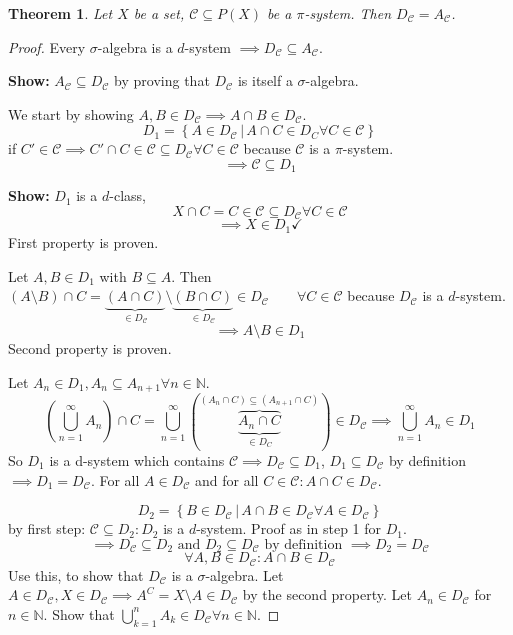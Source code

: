 \documentclass{article}
\newtheorem{theorem}{Theorem}  \numberwithin{theorem}{section}
\newcommand{\setdef}[2]{\left\{\left.#1\,\right|\,#2\right\}}
\begin{document}
\begin{theorem} %
  Let $X$ be a set, $\mathcal C \subseteq P(X)$ be a $\pi$-system. Then $D_{\mathcal C} = A_{\mathcal C}$.
\end{theorem}
\begin{proof}
  Every $\sigma$-algebra is a $d$-system $\implies D_{\mathcal C} \subseteq A_{\mathcal C}$.

  \textbf{Show:} $A_{\mathcal C} \subseteq D_{\mathcal C}$ by proving that $D_{\mathcal C}$ is itself a $\sigma$-algebra.

  We start by showing $A,B \in D_{\mathcal C} \implies A \cap B \in D_{\mathcal C}$.
  \[ D_1 = \setdef{A \in D_{\mathcal C}}{A \cap C \in D_C \forall C \in \mathcal C} \]
  if $C' \in \mathcal C \implies C' \cap C \in \mathcal C \subseteq D_{\mathcal C} \forall C \in \mathcal C$ because $\mathcal C$ is a $\pi$-system.
  \[ \implies \mathcal C \subseteq D_1 \]

  \textbf{Show:} $D_1$ is a $d$-class,
  \[ X \cap C = C \in \mathcal C \subseteq D_{\mathcal C} \forall C \in \mathcal C \]
  \[ \implies X \in D_1 \checkmark \]
  First property is proven.

  Let $A,B \in D_1$ with $B \subseteq A$. Then $(A \setminus B) \cap C = \underbrace{(A \cap C)}_{\in D_{\mathcal C}} \setminus \underbrace{(B \cap C)}_{\in D_{\mathcal C}} \in D_{\mathcal C} \qquad \forall C \in \mathcal C$
  because $D_{\mathcal C}$ is a $d$-system.
  \[ \implies A \setminus B \in D_1 \]
  Second property is proven.

  Let $A_n \in D_1, A_n \subseteq A_{n+1} \forall n \in \mathbb N$.
  \[ (\bigcup_{n=1}^\infty A_n) \cap C = \bigcup_{n=1}^\infty \left(\overbrace{\underbrace{A_n \cap C}_{\in D_C}}^{(A_n \cap C) \subseteq (A_{n+1} \cap C)}\right) \in D_{\mathcal C} \implies \bigcup_{n=1}^\infty A_n \in D_1 \]
  So $D_1$ is a d-system which contains $\mathcal C \implies D_{\mathcal C} \subseteq D_1$, $D_1 \subseteq D_{\mathcal C}$ by definition $\implies D_1 = D_{\mathcal C}$.
  For all $A \in D_{\mathcal C}$ and for all $C \in \mathcal C: A \cap C \in D_{\mathcal C}$.

  \[ D_2 = \setdef{B \in D_{\mathcal C}}{A \cap B \in D_{\mathcal C} \forall A \in D_{\mathcal C}} \]
  by first step: $\mathcal C \subseteq D_2: D_2$ is a $d$-system. Proof as in step 1 for $D_1$.
  \[ \implies D_{\mathcal C} \subseteq D_2 \text{ and } D_2 \subseteq D_{\mathcal C} \text{ by definition } \implies D_2 = D_{\mathcal C} \]
  \[ \forall A, B \in D_{\mathcal C}: A \cap B \in D_{\mathcal C} \]
  Use this, to show that $D_{\mathcal C}$ is a $\sigma$-algebra.
  Let $A \in D_{\mathcal C}, X \in D_{\mathcal C} \implies A^C = X \setminus A \in D_{\mathcal C}$ by the second property.
  Let $A_n \in D_{\mathcal C}$ for $n \in \mathbb N$. Show that $\bigcup_{k=1}^n A_k \in D_{\mathcal C} \forall n \in \mathbb N$.


\end{proof}
\end{document}
